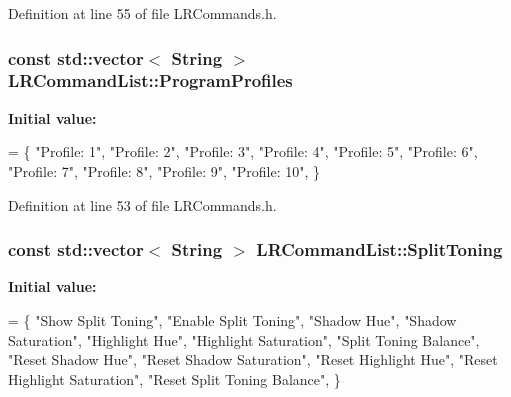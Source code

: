 Definition at line 55 of file L\+R\+Commands.\+h.

\subsubsection[{\texorpdfstring{Program\+Profiles}{ProgramProfiles}}]{\setlength{\rightskip}{0pt plus 5cm}const std\+::vector$<$ String $>$ L\+R\+Command\+List\+::\+Program\+Profiles\hspace{0.3cm}{\ttfamily [static]}}\hypertarget{class_l_r_command_list_a7c9b1fa029a6e4bc9de3bca532d508af}{}\label{class_l_r_command_list_a7c9b1fa029a6e4bc9de3bca532d508af}
{\bfseries Initial value\+:}
\begin{DoxyCode}
= \{
    \textcolor{stringliteral}{"Profile: 1"},
    \textcolor{stringliteral}{"Profile: 2"},
    \textcolor{stringliteral}{"Profile: 3"},
    \textcolor{stringliteral}{"Profile: 4"},
    \textcolor{stringliteral}{"Profile: 5"},
    \textcolor{stringliteral}{"Profile: 6"},
    \textcolor{stringliteral}{"Profile: 7"},
    \textcolor{stringliteral}{"Profile: 8"},
    \textcolor{stringliteral}{"Profile: 9"},
    \textcolor{stringliteral}{"Profile: 10"},
\}
\end{DoxyCode}


Definition at line 53 of file L\+R\+Commands.\+h.

\subsubsection[{\texorpdfstring{Split\+Toning}{SplitToning}}]{\setlength{\rightskip}{0pt plus 5cm}const std\+::vector$<$ String $>$ L\+R\+Command\+List\+::\+Split\+Toning\hspace{0.3cm}{\ttfamily [static]}}\hypertarget{class_l_r_command_list_ac5789fdf03f0b317e188b6161cf034e5}{}\label{class_l_r_command_list_ac5789fdf03f0b317e188b6161cf034e5}
{\bfseries Initial value\+:}
\begin{DoxyCode}
= \{
    \textcolor{stringliteral}{"Show Split Toning"},
    \textcolor{stringliteral}{"Enable Split Toning"},
    \textcolor{stringliteral}{"Shadow Hue"},
    \textcolor{stringliteral}{"Shadow Saturation"},
    \textcolor{stringliteral}{"Highlight Hue"},
    \textcolor{stringliteral}{"Highlight Saturation"},
    \textcolor{stringliteral}{"Split Toning Balance"},
    \textcolor{stringliteral}{"Reset Shadow Hue"},
    \textcolor{stringliteral}{"Reset Shadow Saturation"},
    \textcolor{stringliteral}{"Reset Highlight Hue"},
    \textcolor{stringliteral}{"Reset Highlight Saturation"},
    \textcolor{stringliteral}{"Reset Split Toning Balance"},
\}
\end{DoxyCode}


